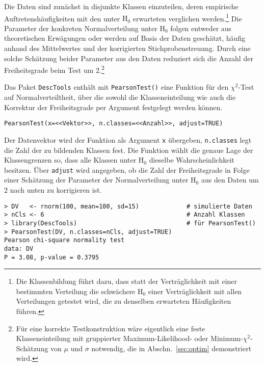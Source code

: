 Die Daten sind zunächst in disjunkte Klassen einzuteilen, deren empirische Auftretenshäufigkeiten mit den unter $\text{H}_{0}$ erwarteten verglichen werden.\footnote{Die Klassenbildung führt dazu, dass statt der Verträglichkeit mit einer bestimmten Verteilung die schwächere $\text{H}_{0}$ einer Verträglichkeit mit allen Verteilungen getestet wird, die zu denselben erwarteten Häufigkeiten führen.} Die Parameter der konkreten Normalverteilung unter $\text{H}_{0}$ folgen entweder aus theoretischen Erwägungen oder werden auf Basis der Daten geschätzt, häufig anhand des Mittelwertes und der korrigierten Stichprobenstreuung. Durch eine solche Schätzung beider Parameter aus den Daten reduziert sich die Anzahl der Freiheitsgrade beim Test um $2$.\footnote{Für eine korrekte Testkonstruktion wäre eigentlich eine feste Klasseneinteilung mit gruppierter Maximum-Likelihood- oder Minimum-$\chi^{2}$-Schätzung von $\mu$ und $\sigma$ notwendig, die in Abschn.\ \ref{sec:optim} demonstriert wird.}

Das Paket \lstinline!DescTools! enthält mit \lstinline!PearsonTest()! eine Funktion für den $\chi^{2}$-Test auf Normalverteiltheit, über die sowohl die Klasseneinteilung wie auch die Korrektur der Freiheitsgrade per Argument festgelegt werden können.
\begin{lstlisting}
PearsonTest(x=<<Vektor>>, n.classes=<<Anzahl>>, adjust=TRUE)
\end{lstlisting}

Der Datenvektor wird der Funktion als Argument \lstinline!x! übergeben, \lstinline!n.classes! legt die Zahl der zu bildenden Klassen fest. Die Funktion wählt die genaue Lage der Klassengrenzen so, dass alle Klassen unter $\text{H}_{0}$ dieselbe Wahrscheinlichkeit besitzen. Über \lstinline!adjust! wird angegeben, ob die Zahl der Freiheitsgrade in Folge einer Schätzung der Parameter der Normalverteilung unter $\text{H}_{0}$ aus den Daten um $2$ nach unten zu korrigieren ist.

\begin{lstlisting}
> DV   <- rnorm(100, mean=100, sd=15)             # simulierte Daten
> nCls <- 6                                       # Anzahl Klassen
> library(DescTools)                              # für PearsonTest()
> PearsonTest(DV, n.classes=nCls, adjust=TRUE)
Pearson chi-square normality test
data: DV
P = 3.08, p-value = 0.3795
\end{lstlisting}

